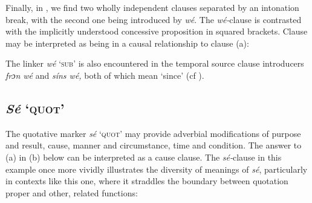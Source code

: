 Finally, in , we find two wholly independent clauses separated by an intonation break, with the second one being introduced by \textit{wé}. The \textit{wé-}clause is contrasted with the implicitly understood concessive proposition in squared brackets. Clause  may be interpreted as being in a causal relationship to clause (a):


\ea%
    \label{ex:key:1466}
\z\z

The linker \textit{wé} ‘\textsc{sub}’ is also encountered in the temporal source clause introducers \textit{frɔn wé} and \textit{síns wé,} both of which mean ‘since’ (cf ).

\subsection{\textit{Sé} ‘\textsc{quot’}} \label{sec:10.7.2}

The quotative marker \textit{sé} ‘\textsc{quot}’ may provide adverbial modifications of purpose and result, cause, manner and circumstance, time and condition. The answer to (a) in (b) below can be interpreted as a cause clause. The \textit{sé-}clause in this example once more vividly illustrates the diversity of meanings of \textit{sé}, particularly in contexts like this one, where it straddles the boundary between quotation proper and other, related functions:


\ea%
    \label{ex:key:1467}
\z\z

